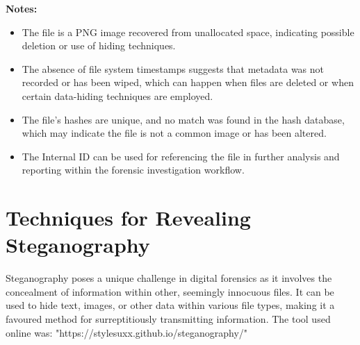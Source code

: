 \textbf{Notes:}
\begin{itemize}
    \item The file is a PNG image recovered from unallocated space, indicating possible deletion or use of hiding techniques.
    \item The absence of file system timestamps suggests that metadata was not recorded or has been wiped, which can happen when files are deleted or when certain data-hiding techniques are employed.
    \item The file's hashes are unique, and no match was found in the hash database, which may indicate the file is not a common image or has been altered.
    \item The Internal ID can be used for referencing the file in further analysis and reporting within the forensic investigation workflow.
\end{itemize}

\section{Techniques for Revealing Steganography}
Steganography poses a unique challenge in digital forensics as it involves the concealment of information within other, seemingly innocuous files. It can be used to hide text, images, or other data within various file types, making it a favoured method for surreptitiously transmitting information. The tool used online was: "https://stylesuxx.github.io/steganography/"


